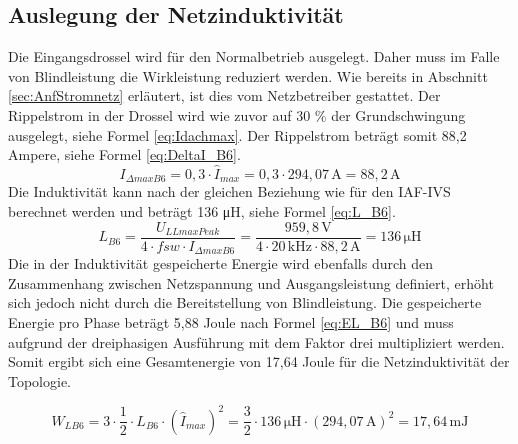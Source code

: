 		\subsection{Auslegung der Netzinduktivität}
				Die Eingangsdrossel wird für den Normalbetrieb ausgelegt. Daher muss im Falle von Blindleistung die Wirkleistung reduziert werden. Wie bereits in Abschnitt \ref{sec:AnfStromnetz} erläutert, ist dies vom Netzbetreiber gestattet. Der Rippelstrom in der Drossel wird wie zuvor auf 30 \% der Grundschwingung ausgelegt, siehe Formel \ref{eq:Idachmax}. Der Rippelstrom beträgt somit 88,2 Ampere, siehe Formel \ref{eq:DeltaI_B6}.\\
			
			\begin{equation}
				\label{eq:DeltaI_B6}
				I_{\Delta max B6}= 0,3 \cdot \hat{I}_{max}= 0,3 \cdot 294,07\, \si{\A} = 88,2\, \si{\A}
			\end{equation}
			Die Induktivität kann nach der gleichen Beziehung wie für den \gls{IAF}-\gls{IVS} berechnet werden und beträgt 136 \si{\micro \henry}, siehe Formel \ref{eq:L_B6}.
			\begin{equation}
				\label{eq:L_B6}
				L_{B6}= \dfrac{U_{LLmaxPeak}}{4\cdot f{sw} \cdot I_{\Delta max B6}} = \dfrac{959,8\, \si{\volt}}{4 \cdot 20\, \si{\kilo \hertz} \cdot 88,2\, \si{\ampere}} =136\, \si{\micro \henry}
			\end{equation}
			Die in der Induktivität gespeicherte Energie wird ebenfalls durch den Zusammenhang zwischen Netzspannung und Ausgangsleistung definiert, erhöht sich jedoch nicht durch die Bereitstellung von Blindleistung. Die gespeicherte Energie pro Phase beträgt 5,88 Joule nach Formel \ref{eq:EL_B6} und muss aufgrund der dreiphasigen Ausführung mit dem Faktor drei multipliziert werden. Somit ergibt sich eine Gesamtenergie von 17,64 Joule für die Netzinduktivität der Topologie.
			
			\begin{equation}
			\label{eq:EL_B6}
			W_{LB6}= 3 \cdot \dfrac{1}{2} \cdot L_{B6} \cdot (\hat{I}_{max})^{2}= \dfrac{3}{2} \cdot 136 \,\si{\micro \henry} \cdot (294,07\, \si{\A})^{2} = 17,64 \, \si{\milli \joule}
			\end{equation}
			
			

		
